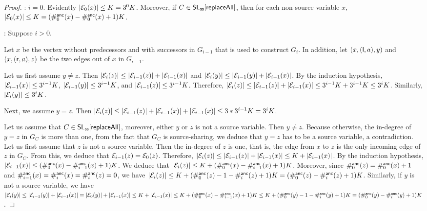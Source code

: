 {\begin{proof}
\smallskip


: $i=0$. Evidently $|\mathcal{E}_0(x)| \le K = 3^0 K$. Moreover, if $C \in \mathsf{SL}_{\sf ss}[\mathsf{replaceAll}]$, then for each non-source variable $x$, $|\mathcal{E}_0(x)| \le K = (\#^{\sf anc}_0(x)-\#^{\sf anc}_0(x)+1) K$.

\smallskip

:
Suppose $i > 0$.

Let $x$ be the vertex without predecessors and with successors in $G_{i-1}$ that is used to construct $G_{i}$. In addition, let $(x, (\mathsf{l}, a), y)$ and $(x, (\mathsf{r}, a), z)$ be the two edges out of $x$ in $G_{i-1}$.

Let us first assume $y \neq z$.
Then $|\mathcal{E}_{i}(z)| \le |\mathcal{E}_{i-1}(z)| + |\mathcal{E}_{i-1}(x)|$ and $|\mathcal{E}_{i}(y)| \le |\mathcal{E}_{i-1}(y)| + |\mathcal{E}_{i-1}(x)|$.  By the induction hypothesis, $|\mathcal{E}_{i-1}(x)| \le  3^{i-1} K$, $|\mathcal{E}_{i-1}(y)| \le 3^{i-1} K$, and $|\mathcal{E}_{i-1}(z)| \le 3^{i-1} K$. Therefore, $|\mathcal{E}_{i}(z)|  \le |\mathcal{E}_{i-1}(z)| + |\mathcal{E}_{i-1}(x)| \le 3^{i-1} K + 3^{i-1} K \le 3^i K$. Similarly, $|\mathcal{E}_{i}(y)| \le 3^i K$.

Next, we assume $y = z$. Then $|\mathcal{E}_{i}(z)| \le |\mathcal{E}_{i-1}(z)| + |\mathcal{E}_{i-1}(x)| + |\mathcal{E}_{i-1}(x)| \le 3* 3^{i-1} K = 3^i K$.

Let us assume that $C \in \mathsf{SL}_{\sf ss}[\mathsf{replaceAll}]$, moreover, either $y$ or $z$ is not a source variable. Then $y \neq z$. Because otherwise, the in-degree of $y=z$ in $G_C$ is more than one, from the fact that $G_C$ is source-sharing, we deduce that $y=z$ has to be a source variable, a contradiction. Let us first assume that $z$ is not a source variable. Then the in-degree of $z$ is one, that is, the edge from $x$ to $z$ is the only incoming edge of $z$ in $G_C$. From this, we deduce that  $\mathcal{E}_{i-1}(z) = \mathcal{E}_0(z)$. Therefore, $|\mathcal{E}_{i}(z)| \le |\mathcal{E}_{i-1}(z)| + |\mathcal{E}_{i-1}(x)| \le K + |\mathcal{E}_{i-1}(x)|$. By the induction hypothesis, $|\mathcal{E}_{i-1}(x)| \le (\#^{\sf anc}_{0}(x) - \#^{\sf anc}_{i-1}(x)+1)K$. We deduce that $|\mathcal{E}_{i}(z)| \le K+ (\#^{\sf anc}_{0}(x) - \#^{\sf anc}_{i-1}(x)+1)K$. Moreover, since $\#^{\sf anc}_{0}(z) = \#^{\sf anc}_{0}(x)+1$ and $\#^{\sf anc}_{i-1}(x)=\#^{\sf anc}_{i}(x)= \#^{\sf anc}_{i}(z)=0$, we have $|\mathcal{E}_{i}(z)| \le K+ (\#^{\sf anc}_{0}(z)-1 - \#^{\sf anc}_{i}(z)+1)K = (\#^{\sf anc}_{0}(z) - \#^{\sf anc}_{i}(z)+1)K$.
Similarly, if $y$ is not a source variable, we have $|\mathcal{E}_{i}(y)| \le |\mathcal{E}_{i-1}(y)| + |\mathcal{E}_{i-1}(x)| = |\mathcal{E}_{0}(y)| + |\mathcal{E}_{i-1}(x)| \le K+|\mathcal{E}_{i-1}(x)| \le K+ (\#^{\sf anc}_{0}(x) - \#^{\sf anc}_{i-1}(x)+1)K \le K+ (\#^{\sf anc}_{0}(y)-1 - \#^{\sf anc}_{i}(y)+1)K = (\#^{\sf anc}_{0}(y) - \#^{\sf anc}_{i}(y)+1)K$.


\end{proof}}
